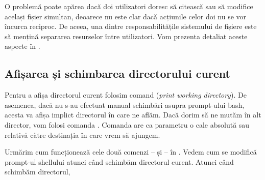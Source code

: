 O problemă poate apărea dacă doi utilizatori doresc să citească sau să modifice același fișier simultan, deoarece nu este clar dacă acțiunile celor doi nu se vor încurca reciproc.
De aceea, una dintre responsabilitățile sistemului de fișiere este să mențină separarea resurselor între utilizatori.
Vom prezenta detaliat aceste aspecte în .

\subsection{Afișarea și schimbarea directorului curent}
\label{sec:fs:pwd-cd}

Pentru a afișa directorul curent folosim comand  (\textit{print working directory}).
De asemenea, dacă nu s-au efectuat manual schimbări asupra prompt-ului bash, acesta va afișa implict directorul în care ne aflăm.
Dacă dorim să ne mutăm în alt director, vom folosi comanda .
Comanda  are ca parametru o cale absolută sau relativă către destinația în care vrem să ajungem.

Urmărim cum funcționează cele două comenzi --  și  -- în .
Vedem cum se modifică prompt-ul shellului atunci când schimbăm directorul curent.
Atunci când schimbăm directorul,


